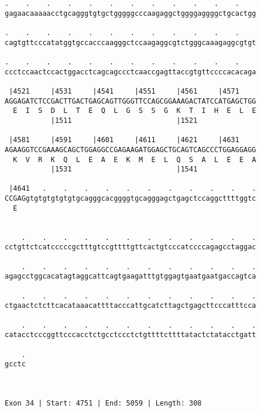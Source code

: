 \documentclass{article}
\begin{document}
\begin{Verbatim}
.    .    .    .    .    .    .    .    .    .    .    .    
gagaacaaaaacctgcagggtgtgctgggggcccaagaggctggggaggggctgcactgg
                                                            
.    .    .    .    .    .    .    .    .    .    .    .    
cagtgttcccatatggtgccacccaagggctccaagaggcgtctgggcaaagaggcgtgt
                                                            
.    .    .    .    .    .    .    .    .    .    .    .    
ccctccaactccactggacctcagcagccctcaaccgagttaccgtgttccccacacaga
                                                            
 |4521     |4531     |4541     |4551     |4561     |4571    
AGGAGATCTCCGACTTGACTGAGCAGTTGGGTTCCAGCGGAAAGACTATCCATGAGCTGG
  E  I  S  D  L  T  E  Q  L  G  S  S  G  K  T  I  H  E  L  E
           |1511                         |1521              
  
 |4581     |4591     |4601     |4611     |4621     |4631    
AGAAGGTCCGAAAGCAGCTGGAGGCCGAGAAGATGGAGCTGCAGTCAGCCCTGGAGGAGG
  K  V  R  K  Q  L  E  A  E  K  M  E  L  Q  S  A  L  E  E  A
           |1531                         |1541              
  
 |4641   .    .    .    .    .    .    .    .    .    .    .
CCGAGgtgtgtgtgtgtgcagggcacggggtgcagggagctgagctccaggcttttggtc
  E                                                         
                                                            
  
    .    .    .    .    .    .    .    .    .    .    .    .
cctgttctcatcccccgctttgtccgttttgttcactgtcccatccccagagcctaggac
                                                            
    .    .    .    .    .    .    .    .    .    .    .    .
agagcctggcacatagtaggcattcagtgaagatttgtggagtgaatgaatgaccagtca
                                                            
    .    .    .    .    .    .    .    .    .    .    .    .
ctgaactctcttcacataaacattttacccattgcatcttagctgagcttcccatttcca
                                                            
    .    .    .    .    .    .    .    .    .    .    .    .
catacctcccggttcccacctctgcctccctctgttttcttttatactctatacctgatt
                                                            
    .
gcctc
     
     
 
Exon 34 | Start: 4751 | End: 5059 | Length: 308




\end{Verbatim}
\end{document}
